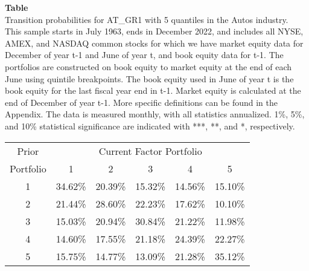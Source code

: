 \begin{table*}[ht!]
\raggedright
{}
\label{tab: transition_probs_AT_GR1_Autos_with_5_quantiles}
\textbf{Table \thetable} \\
Transition probabilities for AT_GR1 with 5 quantiles in the Autos industry. \\
\hspace*{1em}This sample starts in July 1963, ends in December 2022, and includes all NYSE, AMEX, and NASDAQ common stocks for which we have market equity data for December of year t-1 and June of year t, and book equity data for t-1. The portfolios are constructed on book equity to market equity at the end of each June using quintile breakpoints.  The book equity used in June of year t is the book equity for the last fiscal year end in t-1.  Market equity is calculated at the end of December of year t-1.  More specific definitions can be found in the Appendix.  The data is measured monthly, with all statistics annualized.  1\%, 5\%, and 10\% statistical significance are indicated with ***, **, and *, respectively. \\
\vspace{0.5em}
\centering
\begin{adjustbox}{max width=\textwidth}
\begin{tabular}{@{}cccccc@{}}
\toprule
Prior & \multicolumn{5}{c}{Current Factor Portfolio} \\
Portfolio & 1 & 2 & 3 & 4 & 5 \\
\midrule
1 & 34.62\% & 20.39\% & 15.32\% & 14.56\% & 15.10\% \\
2 & 21.44\% & 28.60\% & 22.23\% & 17.62\% & 10.10\% \\
3 & 15.03\% & 20.94\% & 30.84\% & 21.22\% & 11.98\% \\
4 & 14.60\% & 17.55\% & 21.18\% & 24.39\% & 22.27\% \\
5 & 15.75\% & 14.77\% & 13.09\% & 21.28\% & 35.12\% \\
\bottomrule
\end{tabular}
\end{adjustbox}
\end{table*}